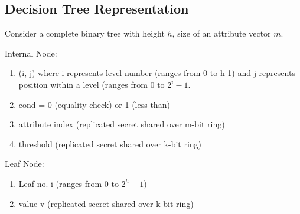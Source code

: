 \subsection{Decision Tree Representation}
Consider a complete binary tree with height $h$, size of an attribute vector $m$. 

Internal Node:
\begin{enumerate}
    \item (i, j) where i represents level number (ranges from 0 to h-1) and j represents position within a level (ranges from 0 to $2^i - 1$.
    \item cond = 0 (equality check) or 1 (less than) 
    \item attribute index (replicated secret shared over m-bit ring)
    \item threshold (replicated secret shared over k-bit ring)
\end{enumerate}

Leaf Node:
\begin{enumerate}
    \item Leaf no. i (ranges from 0 to $2^h - 1$) 
    \item value v (replicated secret shared over k bit ring)
\end{enumerate}

